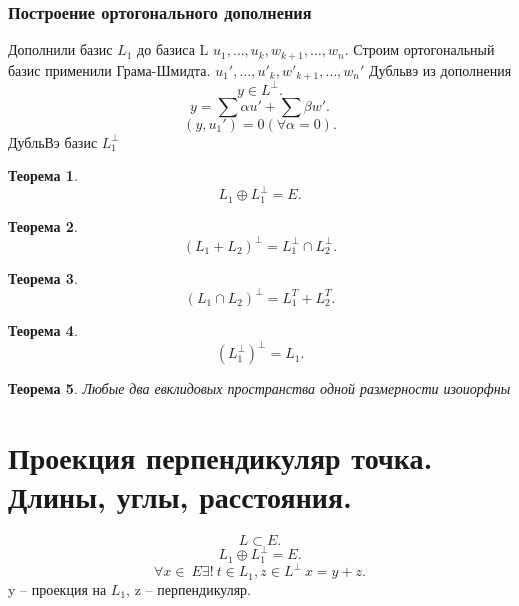 \documentclass{scrartcl}
\newtheorem{theorem}{Теорема}
\begin{document}
\subsubsection{Построение ортогонального дополнения}
Дополнили базис $L_1$ до базиса L $u_1,\dots,u_{k},w_{k+1},\dots,w_{n}$. Строим ортогональный базис применили Грама-Шмидта. $u_1',\dots,u'_{k},w'_{k + 1},\dots,w_{n}'$
Дубльвэ из дополнения\\
\[
y \in L^{\perp}
.\] 
\[
y = \sum \alpha u' + \sum \beta w'
.\] 
\[
    (y,u_1') = 0 (\forall  \alpha = 0)
.\] 
ДубльВэ базис $L_1^{\perp}$
\begin{theorem}
    \[
    L_1 \oplus L_1^{\perp} = E
    .\] 
\end{theorem}
\begin{theorem}
    \[
   (  L_1 + L_2 )^{\perp} = L_1^{\perp} \cap L_2^{\perp}
    .\] 
\end{theorem}
\begin{theorem}
    \[
        (L_1 \cap L_2)^{\perp} = L_1^{T} + L_2^{T}
    .\] 
\end{theorem}
\begin{theorem}
    \[
        (L_1^{\perp})^{\perp} = L_1
    .\] 
\end{theorem}
\begin{theorem}
    Любые два евклидовых пространства одной размерности изоиорфны
\end{theorem}
\section{Проекция перпендикуляр точка. Длины, углы, расстояния.}
\[
L \subset E
.\] 
\[
L_1 \oplus L_1^{\perp} = E
.\] 
\[
\forall  x \in ~E \exists !~t \in L_1,z \in L^{\perp}~x = y + z
.\] 
y -- проекция на $L_1$, z -- перпендикуляр.
\end{document}
